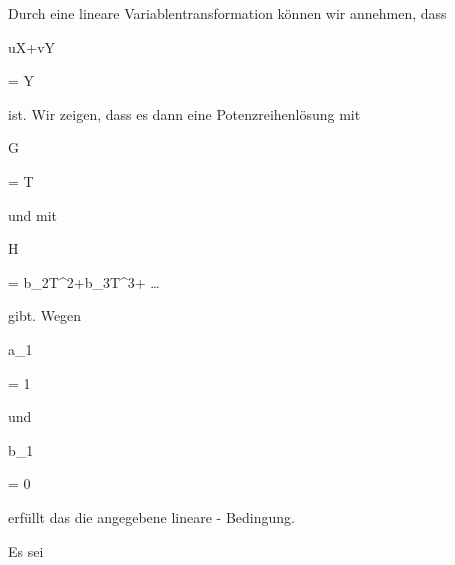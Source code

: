 {


Durch eine lineare Variablentransformation können wir annehmen, dass


\mavergleichskette

{\vergleichskette

{ uX+vY
}

{ = }{ Y
}

{  }{
}

{    }{
}

{   }{
}

}
{}{}{}
ist. Wir zeigen, dass es dann eine Potenzreihenlösung mit


\mavergleichskette

{\vergleichskette

{G
}

{ = }{ T
}

{  }{
}

{    }{
}

{   }{
}

}
{}{}{}
und mit
 {} {}


\mavergleichskette

{\vergleichskette

{ H
}

{ = }{b_2T^2+b_3T^3+ \ldots
}

{  }{
}

{    }{
}

{   }{
}

}
{}{}{}
gibt. Wegen


\mavergleichskette

{\vergleichskette

{a_1
}

{ = }{ 1
}

{  }{
}

{    }{
}

{   }{
}

}
{}{}{}
und


\mavergleichskette

{\vergleichskette

{b_1
}

{ = }{ 0
}

{  }{
}

{    }{
}

{   }{
}

}
{}{}{}
erfüllt das die angegebene lineare
 {-} {}Bedingung.


Es sei


\mavergleichskette

{\vergleichskette

}}
